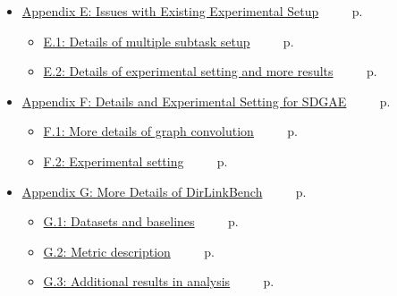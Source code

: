 \begin{itemize}
   \vspace{4pt}
   \item \hyperlink{app_issues}{Appendix E: Issues with Existing Experimental Setup} ~~~~ p.\pageref{app_issues}
   \vspace{4pt}
   \begin{itemize}[leftmargin=2em, nosep] %
    \item \hyperlink{app_issues_subtask}{E.1: Details of multiple subtask setup} ~~~~ p.\pageref{app_issues_subtask} \\
    \item \hyperlink{app_issues_results}{E.2: Details of experimental setting and more results} ~~~~ p.\pageref{app_issues_results}
  \end{itemize}
   \vspace{4pt}
  \item \hyperlink{app_sdgae}{Appendix F: Details and Experimental Setting for SDGAE} ~~~~ p.\pageref{app_sdgae}
   \vspace{4pt}
   \begin{itemize}[leftmargin=2em, nosep] %
    \item \hyperlink{app_sdgae_conv}{F.1: More details of graph convolution} ~~~~ p.\pageref{app_sdgae_conv} \\
    \item \hyperlink{app_sdgae_setting}{F.2: Experimental setting} ~~~~ p.\pageref{app_sdgae_setting}
  \end{itemize}
  
  \vspace{4pt}
  \item \hyperlink{app:experiments}{Appendix G: More Details of DirLinkBench} ~~~~ p.\pageref{app:experiments}
  \vspace{4pt}
  \begin{itemize}[leftmargin=2em, nosep] %
    \item \hyperlink{app_dataset_baseline}{G.1: Datasets and baselines} ~~~~ p.\pageref{app_dataset_baseline} \\
    \item \hyperlink{app_bench_metric}{G.2: Metric description} ~~~~ p.\pageref{app_bench_metric} \\
    \item \hyperlink{app_bench_res_ana}{G.3: Additional results in analysis} ~~~~ p.\pageref{app_bench_res_ana}
    
  \end{itemize}


\end{itemize}

